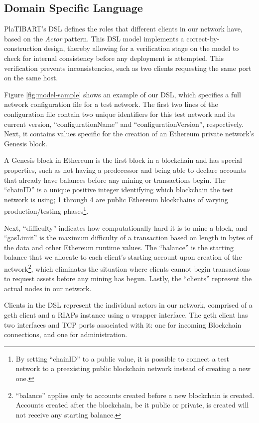 \subsection{Domain Specific Language}

PlaTIBART's DSL defines the roles that different clients in our network have, based on the \textit{Actor} pattern. This DSL model implements a correct-by-construction design, thereby allowing for a verification stage on the model to check for internal consistency before any deployment is attempted. This verification prevents inconsistencies, such as two clients requesting the same port on the same host. 

Figure \ref{fig:model-sample} shows an example of our DSL, which specifies a full network configuration file for a test network. The first two lines of the configuration file contain two unique identifiers for this test network and its current version, ``configurationName'' and ``configurationVersion'', respectively. Next, it contains values specific for the creation of an Ethereum private network's Genesis block. 

A Genesis block in Ethereum is the first block in a blockchain and has special properties, such as not having a predecessor and being able to declare accounts that already have balances before any mining or transactions begin. The ``chainID'' is a unique positive integer identifying which blockchain the test network is using; 1 through 4 are public Ethereum blockchains of varying production/testing phases\footnote{By setting ``chainID'' to a public value, it is possible to connect a test network to a preexisting public blockchain network instead of creating a new one.}. 

Next, ``difficulty'' indicates how computationally hard it is to mine a block, and ``gasLimit'' is the maximum difficulty of a transaction based on length in bytes of the data and other Ethereum runtime values. The ``balance'' is the starting balance that we allocate to each client's starting account upon creation of the network\footnote{``balance'' applies only to accounts created before a new blockchain is created. Accounts created after the blockchain, be it public or private, is created will not receive any starting balance.}, which eliminates the situation where clients cannot begin transactions to request assets before any mining has begun. Lastly, the ``clients'' represent the actual nodes in our network. 

Clients in the DSL represent the individual actors in our network, comprised of a geth client and a RIAPs instance using a wrapper interface. The geth client has two interfaces and TCP ports associated with it: one for incoming Blockchain connections, and one for administration. 

